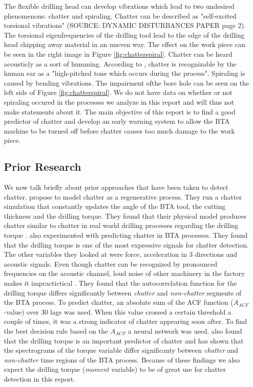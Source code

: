 \documentclass[12 pt]{scrartcl}
\begin{document}
The flexible drilling head can develop vibrations which lead to two undesired phenomenons: chatter and spiraling.
Chatter can be described as "self-excited torsional vibrations" (SOURCE: DYNAMIC DISTURBANCES PAPER page 2). The torsional eigenfrequencies of the drilling tool lead to the edge of the drilling head chipping away material in an uneven way. The effect on the work piece can be seen in the right image in Figure \ref{fig:chatterspiral}. Chatter can be heard acousticly as a sort of humming. According to \citet[p.~14]{theis2004modelling}, chatter is recognizable by the human ear as a "high-pitched tone which occurs
during the process".
Spiraling is caused by bending vibrations. The impairment ofthe bore hole can be seen on the left side of  Figure \ref{fig:chatterspiral}. We do not have data on whether or not spiraling occured in the processes we analyze in this report and will thus not make statements about it.
The main objective of this report is to find a good predictor of chatter and develop an early warning system to allow the BTA machine to be turned off before chatter causes too much damage to the work piece.

\subsection{Prior Research}

We now talk briefly about prior approaches that have been taken to detect chatter. \citet{raabe2010dynamic} propose to model chatter as a regenerative process. They run a chatter simulation that constantly updates the angle of the BTA tool, the cutting thickness and the drilling torque. They found that their physical model produces chatter similar to chatter in real world drilling processes regarding the drilling torque \citep[p.~748]{raabe2010dynamic}.
\citet{weinert2001statistics} also experimented with predicting chatter in BTA processes. They found that the drilling torque is one of the most expressive signals for chatter detection. The other variables they looked at were force, acceleration in 3 directions and acoustic signals. Even though chatter can be recognized by pronounced frequencies on the acoustic channel, loud noise of other machinery in the factory makes it impractictical \citep[p.~6]{weinert2001statistics}. They found that the autocorrelation function for the drilling torque differs significantly between \emph{chatter} and \emph{non-chatter} segments of the BTA process.
To predict chatter, an absolute sum of the ACF function ($A_{ACF}$-value) over 30 lags was used. When this value crossed a certain threshold a couple of times, it was a strong indicator of chatter appearing soon after. To find the best decision rule based on the $A_{ACF}$ a neural network was used.
\citet[p.~27]{theis2004modelling} also found that the drilling torque is an important predictor of chatter and has shown that the spectrograms of the torque variable differ significanty between \emph{chatter} and \emph{non-chatter} time regions of the BTA process.
Because of these findings we also expect the drilling torque (\emph{moment} variable) to be of great use for chatter detection in this report.
\end{document}
